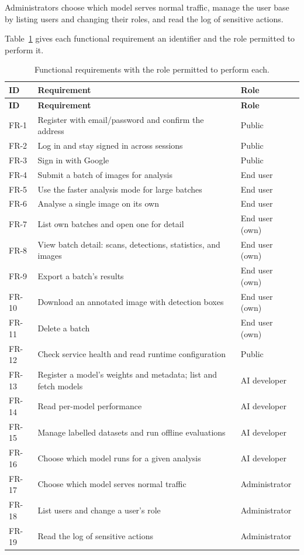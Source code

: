 Administrators choose which model serves normal traffic, manage the user base by
listing users and changing their roles, and read the log of sensitive actions.

\medskip

Table~\ref{tab:ch3-fr} gives each functional requirement an identifier and the
role permitted to perform it.

\begin{singlespace}
\begin{longtable}{@{}p{1.3cm}p{8.2cm}p{3.0cm}@{}}
\caption{Functional requirements with the role permitted to perform each.}
\label{tab:ch3-fr} \\
\toprule
\textbf{ID} & \textbf{Requirement} & \textbf{Role} \\
\midrule
\endfirsthead
\toprule
\textbf{ID} & \textbf{Requirement} & \textbf{Role} \\
\midrule
\endhead
\bottomrule
\endfoot
\bottomrule
\endlastfoot
FR-1 & Register with email/password and confirm the address & Public \\
FR-2 & Log in and stay signed in across sessions & Public \\
FR-3 & Sign in with Google & Public \\
FR-4 & Submit a batch of images for analysis & End user \\
FR-5 & Use the faster analysis mode for large batches & End user \\
FR-6 & Analyse a single image on its own & End user \\
FR-7 & List own batches and open one for detail & End user (own) \\
FR-8 & View batch detail: scans, detections, statistics, and images & End user (own) \\
FR-9 & Export a batch's results & End user (own) \\
FR-10 & Download an annotated image with detection boxes & End user (own) \\
FR-11 & Delete a batch & End user (own) \\
FR-12 & Check service health and read runtime configuration & Public \\
FR-13 & Register a model's weights and metadata; list and fetch models & AI developer \\
FR-14 & Read per-model performance & AI developer \\
FR-15 & Manage labelled datasets and run offline evaluations & AI developer \\
FR-16 & Choose which model runs for a given analysis & AI developer \\
FR-17 & Choose which model serves normal traffic & Administrator \\
FR-18 & List users and change a user's role & Administrator \\
FR-19 & Read the log of sensitive actions & Administrator \\
\end{longtable}
\end{singlespace}

